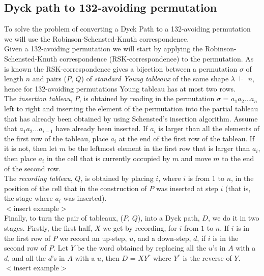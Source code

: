 \documentclass[12pt]{article}
\begin{document}
\subsection{Dyck path to 132-avoiding permutation}
To solve the problem of converting a Dyck Path to a 132-avoiding permutation we will use the Robinson-Schensted-Knuth correspondence.\\
Given a 132-avoiding permutation we will start by applying the Robinson-Schensted-Knuth correspondence (RSK-correspondence) to the permutation. As is known the RSK-correspondence gives a bijection between a permutation $\sigma$ of length $n$ and pairs ($P$, $Q$) of {\it standard Young tableaux} of the same shape $\lambda$  $\vdash$ $n$, hence for 132-avoiding permutations Young tableau has at most two rows.\\
The {\it insertion tableau}, $P$, is obtained by reading in the permutation $\sigma$ = $a_{1}a_{2}...a_{n}$ left to right and inserting the element of the permutation into the partial tableau that has already been obtained by using Schensted's insertion algorithm. Assume that $a_{1}a_{2}...a_{i-1}$ have already been inserted. If $a_{i}$ is larger than all the elements of the first row of the tableau, place $a_{i}$ at the end of the first row of the tableau. If it is not, then let $m$ be the leftmost element in the first row that is larger than $a_{i}$, then place $a_{i}$ in the cell that is currently occupied by $m$ and move $m$ to the end of the second row.\\
The {\it recording tableau}, $Q$, is obtained by placing $i$, where $i$ is from $1$ to $n$, in the position of the cell that in the construction of $P$ was inserted at step $i$ (that is, the stage where $a_{i}$ was inserted).\\
$<$insert example$>$\\
Finally, to turn the pair of tableaux, ($P$, $Q$), into a Dyck path, $D$, we do it in two stages. Firstly, the first half, $X$ we get by recording, for $i$ from $1$ to $n$. If $i$ is in the first row of $P$ we record an up-step, $u$, and a down-step, $d$, if $i$ is in the second row of $P$. Let $Y$ be the word obtained by replacing all the $u$'s in $A$ with a $d$, and all the $d$'s in $A$ with a $u$, then $D$ = $XY^r$ where $Y^r$ is the reverse of $Y$.\\
$<$insert example$>$


\end{document}
